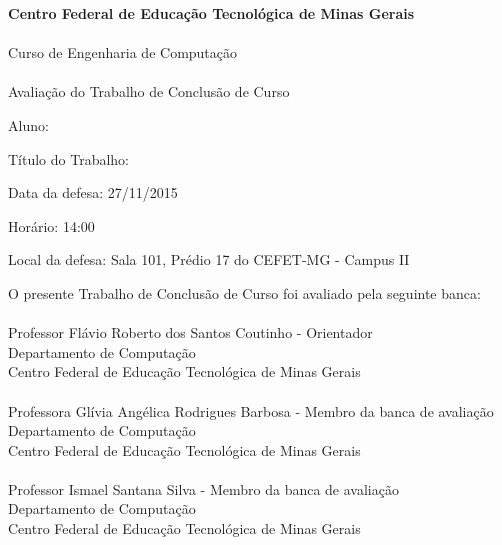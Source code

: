 \makeatletter
\begin{folhadeaprovacao}
	\begin{center}
		\textbf{Centro Federal de Educação Tecnológica de Minas Gerais}\\~\\
		
		Curso de Engenharia de Computação \\~\\ 
		
		Avaliação do Trabalho de Conclusão de Curso
	\end{center}
	
	\hfill \break
	\hfill \break
	\noindent Aluno: \imprimirautor
	
	\noindent Título do Trabalho: \imprimirtitulo
	
	\noindent Data da defesa: 27/11/2015
	
	\noindent Horário: 14:00
	
	\noindent Local da defesa: Sala 101, Prédio 17 do CEFET-MG - Campus II
	\hfill \break
	\newline
	\begin{center}
	O  presente Trabalho de Conclusão de Curso foi avaliado pela seguinte banca:\\~\\ 
	Professor Flávio Roberto dos Santos Coutinho - Orientador \\
	Departamento de Computação \\
	Centro Federal de Educação Tecnológica de Minas Gerais \\~\\
	
	Professora Glívia Angélica Rodrigues Barbosa - Membro da banca de avaliação \\
	Departamento de Computação \\
	Centro Federal de Educação Tecnológica de Minas Gerais \\~\\
	
	Professor Ismael Santana Silva - Membro da banca de avaliação \\
	Departamento de Computação \\
	Centro Federal de Educação Tecnológica de Minas Gerais \\~\\
	\end{center}
\end{folhadeaprovacao}